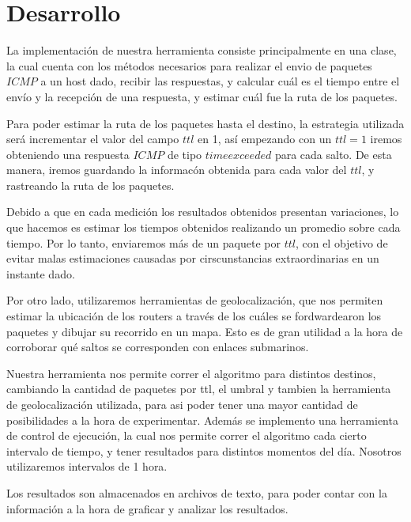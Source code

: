 \section{Desarrollo}


La implementaci\'on de nuestra herramienta consiste principalmente en una clase, la cual cuenta con los m\'etodos necesarios para realizar el envio de paquetes $ICMP$ a un host dado, recibir las respuestas, y calcular cu\'al es el tiempo entre el env\'io y la recepci\'on de una respuesta, y estimar cu\'al fue la ruta de los paquetes. 

Para poder estimar la ruta de los paquetes hasta el destino, la estrategia utilizada ser\'a incrementar el valor del campo $ttl$ en 1, as\'i empezando con un $ttl = 1$ iremos obteniendo una respuesta $ICMP$ de tipo $time exceeded$ para cada salto. De esta manera, iremos guardando la informac\'on obtenida para cada valor del $ttl$, y rastreando la ruta de los paquetes.

Debido a que en cada medici\'on los resultados obtenidos presentan variaciones, lo que hacemos es estimar los tiempos obtenidos realizando un promedio sobre cada tiempo. Por lo tanto, enviaremos m\'as de un paquete por $ttl$, con el objetivo de evitar malas estimaciones causadas por cirscunstancias extraordinarias en un instante dado.

Por otro lado, utilizaremos herramientas de geolocalizaci\'on, que nos permiten estimar la ubicaci\'on de los routers a trav\'es de los cu\'ales se fordwardearon los paquetes y dibujar su recorrido en un mapa. Esto es de gran utilidad a la hora de corroborar qu\'e saltos se corresponden con enlaces submarinos.

Nuestra herramienta nos permite correr el algoritmo para distintos destinos, cambiando la cantidad de paquetes por ttl, el umbral y tambien la herramienta de geolocalizaci\'on utilizada, para asi poder tener una mayor cantidad de posibilidades a la hora de experimentar.
Adem\'as se implemento una herramienta de control de ejecuci\'on, la cual nos permite correr el algoritmo cada cierto intervalo de tiempo, y tener resultados para distintos momentos del d\'ia. Nosotros utilizaremos intervalos de 1 hora.


Los resultados son almacenados en archivos de texto, para poder contar con la informaci\'on a la hora de graficar y analizar los resultados.
